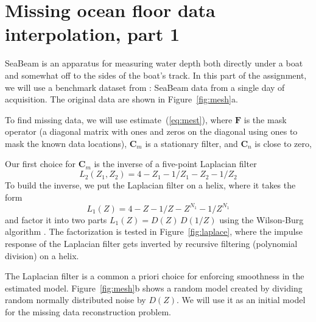 \lstset{language=python,numbers=left,numberstyle=\tiny,showstringspaces=false}


\section{Missing ocean floor data interpolation, part 1}

SeaBeam is an apparatus for measuring water depth both directly under
a boat and somewhat off to the sides of the boat's track. In this part
of the assignment, we will use a benchmark dataset from \cite{gee}:
SeaBeam data from a single day of acquisition. The original data are
shown in Figure~\ref{fig:mesh}a.


To find missing data, we will use estimate~(\ref{eq:mest}), where
$\mathbf{F}$ is the mask operator (a diagonal matrix with ones and
zeros on the diagonal using ones to mask the known data locations),
$\mathbf{C}_m$ is a stationary filter, and $\mathbf{C}_n$ is close to
zero,

Our first choice for $\mathbf{C}_m$ is the inverse of a five-point
Laplacian filter
\begin{equation}
\label{eq:lap2}
L_2(Z_1,Z_2) = 4 - Z_1 - 1/Z_1 - Z_2 - 1/Z_2
\end{equation} 
To build the inverse, we put the Laplacian
filter on a helix, where it takes the form
\begin{equation}
\label{eq:lap1}
L_1(Z) = 4 - Z - 1/Z - Z^{N_1} - 1/Z^{N_1}
\end{equation} 
and factor it into two parts $L_1(Z) = D(Z)\,D(1/Z)$ using the
Wilson-Burg algorithm \cite[]{burg}. The factorization is tested in
Figure~\ref{fig:laplace}, where the impulse response of the Laplacian
filter gets inverted by recursive filtering (polynomial division) on a
helix. 


The Laplacian filter is a common a priori choice for enforcing
smoothness in the estimated model. Figure~\ref{fig:mesh}b shows a
random model created by dividing random normally distributed noise by
$D(Z)$. We will use it as an initial model for the missing data
reconstruction problem. 

